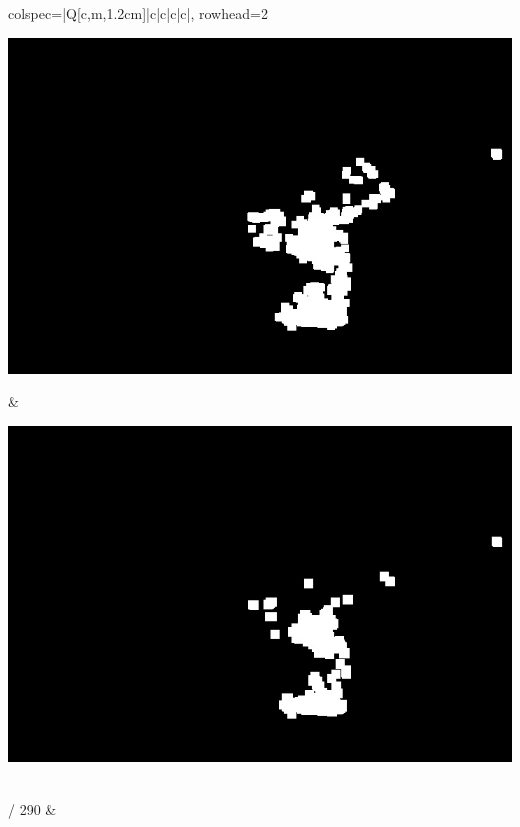 \begin{longtblr}[
            caption = {Hasil uji coba proses \textit{background subtraction} menggunakan GMM yang disempurnakan oleh Operasi Morfologi},
            label = {tab:gmm_morph_9908}
        ]{
            colspec={|Q[c,m,1.2cm]|c|c|c|c|},
            rowhead=2
        }
\begin{minipage}{0.19\textwidth}
                \includegraphics[width=\linewidth]{image/9908/9908_dilated_5x11_frame230.jpg}
            \end{minipage} & 
            \begin{minipage}{0.19\textwidth}
                \includegraphics[width=\linewidth]{image/9908/9908_dilated_7x13_frame230.jpg}
            \end{minipage} \\
             / 290 &
            \begin{minipage}{0.19\textwidth}

\end{minipage}
\end{longtblr}
